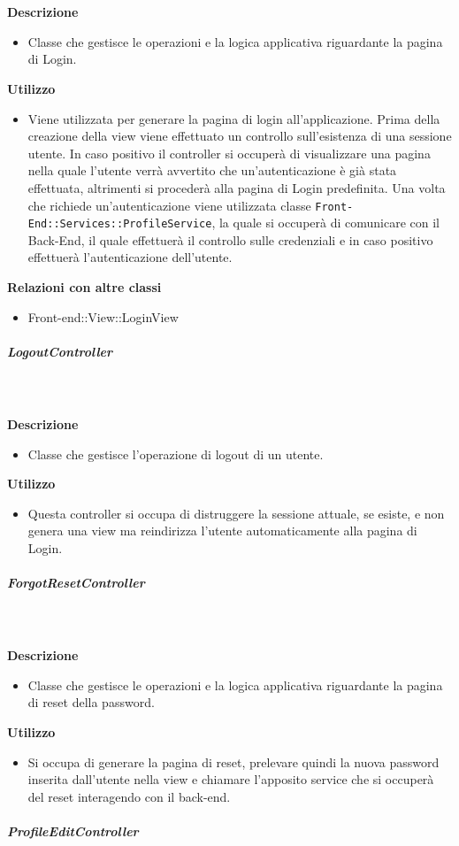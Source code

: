 				\textbf{\\ \\ Descrizione} 
					\begin{itemize}
						\item[] Classe che gestisce le operazioni e la logica applicativa riguardante la pagina di Login.
					\end{itemize}      
				\textbf{Utilizzo}  
					\begin{itemize}
						\item[] Viene utilizzata per generare la pagina di login all'applicazione. Prima della creazione della view viene effettuato un controllo sull'esistenza di una sessione utente. In caso positivo il controller si occuperà di visualizzare una pagina nella quale l'utente verrà avvertito che un'autenticazione è già stata effettuata, altrimenti si procederà alla pagina di Login predefinita. Una volta che richiede un'autenticazione viene utilizzata classe \texttt{Front-End::Services::ProfileService}, la quale si occuperà di comunicare con il Back-End, il quale effettuerà il controllo sulle credenziali e in caso positivo effettuerà l'autenticazione dell'utente.
					\end{itemize}
					\textbf{Relazioni con altre classi}
					\begin{itemize}
							\item{Front-end::View::LoginView}
					\end{itemize}
			\subparagraph{LogoutController}
				
				\textbf{\\ \\ Descrizione} 
					\begin{itemize}
						\item[] Classe che gestisce l'operazione di logout di un utente.
					\end{itemize}      
				\textbf{Utilizzo}  
					\begin{itemize}
						\item[] Questa controller si occupa di distruggere la sessione attuale, se esiste, e non genera una view ma reindirizza l'utente automaticamente alla pagina di Login.
					\end{itemize}
			\subparagraph{ForgotResetController}
				
				\textbf{\\ \\ Descrizione} 
					\begin{itemize}
						\item[] Classe che gestisce le operazioni e la logica applicativa riguardante la pagina di reset della password.
					\end{itemize}      
				\textbf{Utilizzo}  
					\begin{itemize}
						\item[] Si occupa di generare la pagina di reset, prelevare quindi la nuova password inserita dall'utente nella view e chiamare l'apposito service che si occuperà del reset interagendo con il back-end.
					\end{itemize}
			\subparagraph{ProfileEditController}
				
